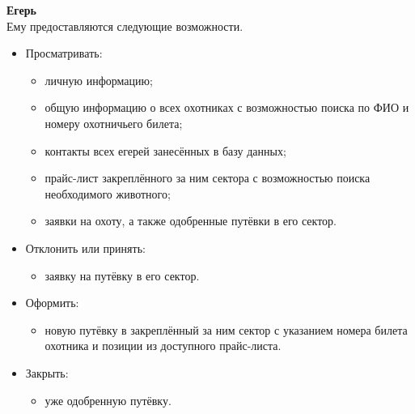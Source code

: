 		\textbf{Егерь} \\
		Ему предоставляются следующие возможности.
		\begin{itemize}
			\item Просматривать:
			\begin{itemize}
				\item личную информацию;
				\item общую информацию о всех охотниках с возможностью поиска по ФИО и номеру охотничьего билета;
				\item контакты всех егерей занесённых в базу данных;
				\item прайс-лист закреплённого за ним сектора с возможностью поиска необходимого животного;
				\item заявки на охоту, а также одобренные путёвки в его сектор.
			\end{itemize}
			\item Отклонить или принять:
			\begin{itemize} 
				\item заявку на путёвку в его сектор.
			\end{itemize}
			\item Оформить:
			\begin{itemize} 
				\item новую путёвку в закреплённый за ним сектор с указанием номера билета охотника и позиции из доступного прайс-листа.
			\end{itemize}
			\item Закрыть:
			\begin{itemize}
				\item уже одобренную путёвку.
			\end{itemize}
			
		\end{itemize}
		

